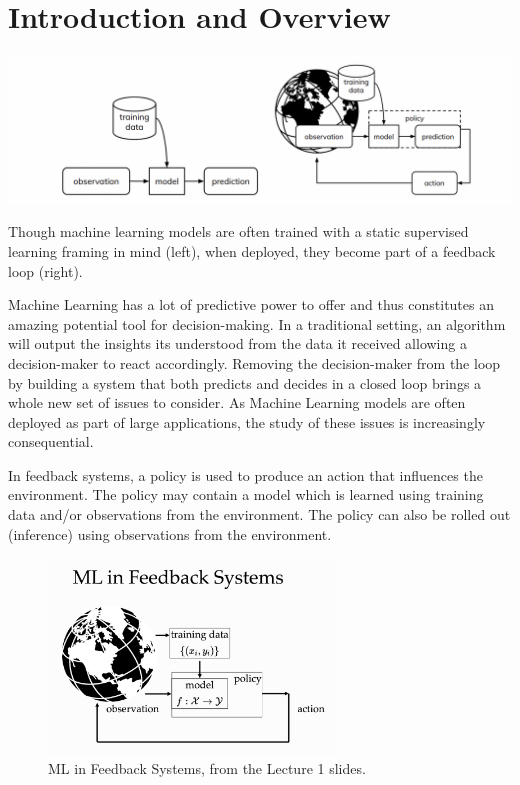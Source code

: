 \graphicspath{ {./0-intro/} }
\chapter*{Introduction and Overview}

\begin{marginfigure}%
  \includegraphics[width=\linewidth]{FeedbackvsTraditional.png}\caption{Though machine learning models are often trained with a static supervised
learning framing in mind (left), when deployed, they become part of a feedback loop
(right).}
  \label{fig:feedback_vs_trad}
\end{marginfigure}

Machine Learning has a lot of predictive power to offer and thus constitutes an amazing potential tool for decision-making. In a traditional setting, an algorithm will output the insights its understood from the data it received allowing a decision-maker to react accordingly. Removing the decision-maker from the loop by building a system that both predicts and decides in a closed loop brings a whole new set of issues to consider. As Machine Learning models are often deployed as part of large applications, the study of these issues is increasingly consequential.

In feedback systems, a policy is used to produce an action that influences the environment.
The policy may contain a model which is learned using training data and/or observations from the environment.
The policy can also be rolled out (inference) using observations from the environment.

\begin{figure}
\centering
\includegraphics[width=3in]{ml_feedback_sys.png}
\caption{ML in Feedback Systems, from the Lecture 1 slides.}
\end{figure}



